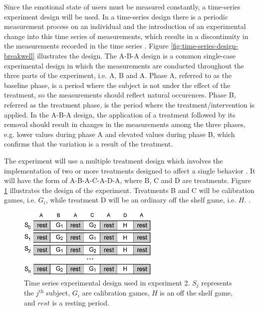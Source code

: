 Since the emotional state of users must be measured constantly, a time-series experiment design will be used. In a time-series design there is a periodic measurement process on an individual and the introduction of an experimental change into this time series of measurements, which results in a discontinuity in the measurements recorded in the time series \parencite{campbell2015experimental}. Figure \ref{fig:time-series-design-breakwell} illustrates the design. The A-B-A design is a common single-case experimental design in which the measurements are conducted throughout the three parts of the experiment, i.e. A, B and A. Phase A, referred to as the baseline phase, is a period where the subject is not under the effect of the treatment, so the measurements should reflect natural occurences. Phase B, referred as the treatment phase, is the period where the treatment/intervention is applied. In the A-B-A design, the application of a treatment followed by its removal should result in changes in the measurements among the three phases, e.g. lower values during phase A and elevated values during phase B, which confirms that the variation is a result of the treatment.

The experiment will use a multiple treatment design which involves the implementation of two or more treatments designed to affect a single behavior \parencite{robson2016real}. It will have the form of A-B-A-C-A-D-A, where B, C and D are treatments. Figure \ref{fig:closing-experiment2-design} illustrates the design of the experiment. Treatments B and C will be calibration games, i.e. $G_i$, while treatment D will be an ordinary off the shelf game, i.e. $H$. .

\begin{figure}[ht]
    \centering
    \includegraphics[width=0.6\textwidth]{figures/closing-experiment2-design.png}
    \caption{Time series experimental design used in experiment 2. $S_j$ represents the $j^{\text{th}}$ subject, $G_i$ are calibration games, $H$ is an off the shelf game, and $rest$ is a resting period.}
    \label{fig:closing-experiment2-design}
\end{figure}

